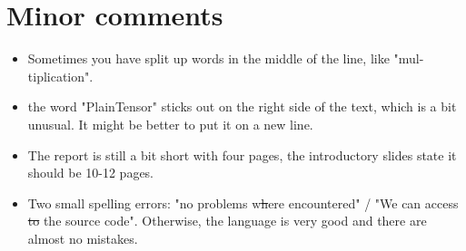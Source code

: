 \documentclass[a4paper]{article}
\begin{document}
\section{Minor comments} %
\begin{itemize}
    \item Sometimes you have split up words in the middle of the line, like "mul- tiplication".
    \item the word "PlainTensor" sticks out on the right side of the text, which is a bit unusual. It might be better to put it on a new line.
    \item The report is still a bit short with four pages, the introductory slides state it should be 10-12 pages.
    \item Two small spelling errors: "no problems w\sout{h}ere encountered" / "We can access \sout{to} the source code". Otherwise, the language is very good and there are almost no mistakes.
\end{itemize}

\label{sec:intro}
\end{document}
